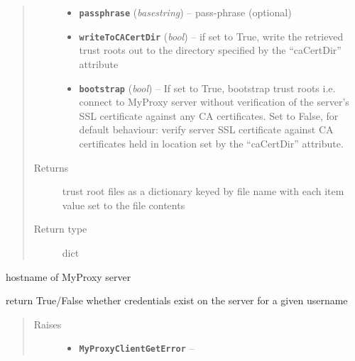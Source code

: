 \documentclass[letterpaper,10pt,english]{sphinxmanual}
\begin{document}
\begin{fulllineitems}
\begin{fulllineitems}
\begin{quote}
\begin{description}
\begin{itemize}
\item {} 
\textbf{\texttt{passphrase}} (\emph{basestring}) -- pass-phrase (optional)

\item {} 
\textbf{\texttt{writeToCACertDir}} (\emph{bool}) -- if set to True, write the retrieved trust roots out to the directory specified by the ``caCertDir'' attribute

\item {} 
\textbf{\texttt{bootstrap}} (\emph{bool}) -- If set to True, bootstrap trust roots i.e. connect to MyProxy server without verification of the server's SSL certificate against any CA certificates.  Set to False, for default behaviour: verify server SSL certificate against CA certificates held in location set by the ``caCertDir'' attribute.

\end{itemize}

\item[{Returns}] \leavevmode
trust root files as a dictionary keyed by file name with each item value set to the file contents

\item[{Return type}] \leavevmode
dict

\end{description}\end{quote}

\end{fulllineitems}


\begin{fulllineitems}
\label{client:myproxy.client.MyProxyClient.hostname}
hostname of MyProxy server

\end{fulllineitems}


\begin{fulllineitems}
\label{client:myproxy.client.MyProxyClient.info}
return True/False whether credentials exist on the server for a 
given username
\begin{quote}\begin{description}
\item[{Raises}] \leavevmode\begin{itemize}
\item {} 
\textbf{\texttt{MyProxyClientGetError}} -- 


\end{itemize}
\end{description}
\end{quote}
\end{fulllineitems}
\end{fulllineitems}
\end{document}
